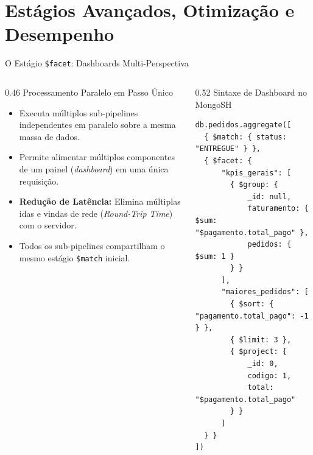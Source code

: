\section[Estágios Avançados e Otimização]{Estágios Avançados, Otimização e Desempenho}

\begin{frame}[fragile]{O Estágio \texttt{\$facet}: Dashboards Multi-Perspectiva}
  \vspace{0.1cm}
  \begin{columns}[t,onlytextwidth]
    \begin{column}{0.46\textwidth}
      \alert{Processamento Paralelo em Passo Único}\par
      \footnotesize
      \begin{itemize}
        \item Executa múltiplos sub-pipelines independentes em paralelo sobre a mesma massa de dados.
        \item Permite alimentar múltiplos componentes de um painel (\textit{dashboard}) em uma única requisição.
        \item \textbf{Redução de Latência:} Elimina múltiplas idas e vindas de rede (\textit{Round-Trip Time}) com o servidor.
        \item Todos os sub-pipelines compartilham o mesmo estágio \lstinline[language=mongosh, basicstyle=\footnotesize\ttfamily]|$match| inicial.
      \end{itemize}
    \end{column}
    \begin{column}{0.52\textwidth}
      \alert{Sintaxe de Dashboard no MongoSH}\par
      \vspace{0.05cm}
      \begin{lstlisting}[language=mongosh, basicstyle=\fontsize{6.8pt}{7.6pt}\ttfamily]
db.pedidos.aggregate([
  { $match: { status: "ENTREGUE" } },
  { $facet: {
      "kpis_gerais": [
        { $group: {
            _id: null,
            faturamento: { $sum: "$pagamento.total_pago" },
            pedidos: { $sum: 1 }
        } }
      ],
      "maiores_pedidos": [
        { $sort: { "pagamento.total_pago": -1 } },
        { $limit: 3 },
        { $project: {
            _id: 0,
            codigo: 1,
            total: "$pagamento.total_pago"
        } }
      ]
  } }
])
      \end{lstlisting}
    \end{column}
  \end{columns}
\end{frame}

